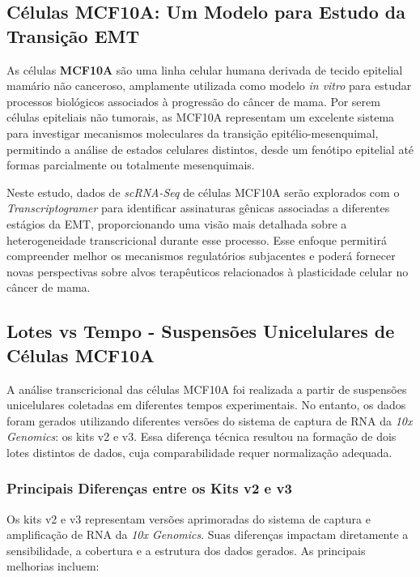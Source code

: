 \documentclass[12pt]{article}
\begin{document}
\subsection{Células MCF10A: Um Modelo para Estudo da Transição EMT}

As células \textbf{MCF10A} são uma linha celular humana derivada de tecido epitelial mamário não canceroso, amplamente utilizada como modelo \textit{in vitro} para estudar processos biológicos associados à progressão do câncer de mama. Por serem células epiteliais não tumorais, as MCF10A representam um excelente sistema para investigar mecanismos moleculares da transição epitélio-mesenquimal, permitindo a análise de estados celulares distintos, desde um fenótipo epitelial até formas parcialmente ou totalmente mesenquimais.  

Neste estudo, dados de \textit{scRNA-Seq} de células MCF10A serão explorados com o \textit{Transcriptogramer} para identificar assinaturas gênicas associadas a diferentes estágios da EMT, proporcionando uma visão mais detalhada sobre a heterogeneidade transcricional durante esse processo. Esse enfoque permitirá compreender melhor os mecanismos regulatórios subjacentes e poderá fornecer novas perspectivas sobre alvos terapêuticos relacionados à plasticidade celular no câncer de mama.


\subsection{Lotes vs Tempo - Suspensões Unicelulares de Células MCF10A}

A análise transcricional das células MCF10A foi realizada a partir de suspensões unicelulares coletadas em diferentes tempos experimentais. No entanto, os dados foram gerados utilizando diferentes versões do sistema de captura de RNA da \textit{10x Genomics}: os kits v2 e v3. Essa diferença técnica resultou na formação de dois lotes distintos de dados, cuja comparabilidade requer normalização adequada.

\subsubsection{Principais Diferenças entre os Kits v2 e v3}

Os kits v2 e v3 representam versões aprimoradas do sistema de captura e amplificação de RNA da \textit{10x Genomics}. Suas diferenças impactam diretamente a sensibilidade, a cobertura e a estrutura dos dados gerados. As principais melhorias incluem:
\end{document}

